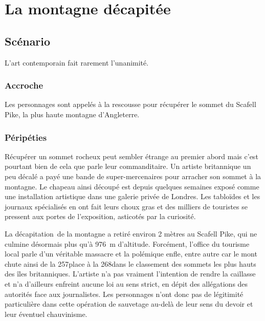 \chapter{La montagne décapitée}

\section{Scénario}

L'art contemporain fait rarement l'unanimité.


\subsection{Accroche}

Les personnages sont appelés à la rescousse pour récupérer le sommet du Scafell Pike, la plus haute montagne d'Angleterre.

\subsection{Péripéties}

Récupérer un sommet rocheux peut sembler étrange au premier abord mais c'est pourtant bien de cela que parle leur commanditaire.
Un artiste britannique un peu décalé a payé une bande de super-mercenaires pour arracher son sommet à la montagne.
Le \og chapeau \fg ainsi découpé est depuis quelques semaines exposé comme une installation artistique dans une galerie privée de Londres.
Les tabloïdes et les journaux spécialisés en ont fait leurs choux gras et des milliers de touristes se pressent aux portes de l'exposition, asticotés par la curiosité.

La \og décapitation \fg de la montagne a retiré environ 2 mètres au Scafell Pike, qui ne culmine désormais plus qu'à \SI{976}{\meter} d'altitude.
Forcément, l'office du tourisme local parle d'un véritable massacre et la polémique enfle, entre autre car le mont chute ainsi de la 257\ieme place à la 268\ieme dans le classement des sommets les plus hauts des îles britanniques.
L'artiste n'a pas vraiment l'intention de rendre la caillasse et n'a d'ailleurs enfreint aucune loi au sens strict, en dépit des allégations des autorités face aux journalistes.
Les personnages n'ont donc pas de légitimité particulière dans cette opération de sauvetage au-delà de leur sens du devoir et leur éventuel chauvinisme.

